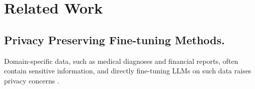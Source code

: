 \section{Related Work}
\subsection{Privacy Preserving Fine-tuning Methods.}
Domain-specific data, such as medical diagnoses and financial reports, often contain sensitive information, and directly fine-tuning LLMs on such data raises privacy concerns \citep{Mokhtarabadi2024EmpoweringPL, Wang2023HowFC, Jang2023ExploringTB}. 
